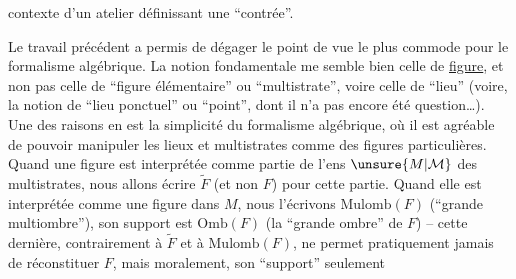 contexte d'un atelier définissant une ``contrée''.

Le travail précédent a permis de dégager le point de vue le plus commode pour le formalisme algébrique. La notion fondamentale me semble bien celle de \uline{figure}, et non pas celle de ``figure élémentaire'' ou ``multistrate'', voire celle de ``lieu'' (voire, la notion de ``lieu ponctuel'' ou ``point'', dont il n'a pas encore été question\ldots). Une des raisons en est la simplicité du formalisme algébrique,
%
 où il est agréable de pouvoir manipuler les lieux et multistrates comme  des figures particulières. Quand une figure  est interprétée  comme partie de l'ens $\unsure{M|\mathcal M}$  des multistrates, nous allons écrire $\widetilde F$ (et non $F$) pour cette partie. Quand elle est interprétée comme une figure  dans $M$, nous l'écrivons $\mathrm{Mulomb}(F)$ (``grande multiombre''), son support est $\mathrm{Omb}(F)$ (la ``grande ombre'' de $F$) -- cette dernière, contrairement à $\widetilde F$ et à $\mathrm{Mulomb}(F)$, ne permet pratiquement jamais de réconstituer $F$,  mais moralement, son ``support'' seulement
